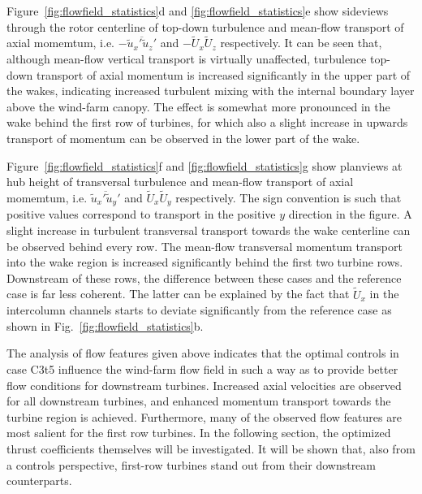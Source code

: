 \documentclass[wes, manuscript]{copernicus}
\begin{document}
Figure~\ref{fig:flowfield_statistics}d and \ref{fig:flowfield_statistics}e show sideviews through the rotor centerline of top-down turbulence and mean-flow transport of axial momemtum, i.e. $-\overline{\widetilde{u}_x' \widetilde{u}_z'}$ and $- \widetilde{U}_x \widetilde{U}_z$ respectively. It can be seen that, although mean-flow vertical transport is virtually unaffected, turbulence top-down transport of axial momentum is increased significantly in the upper part of the wakes, indicating increased turbulent mixing with the internal boundary layer above the wind-farm canopy. The effect is somewhat more pronounced in the wake behind the first row of turbines, for which also a slight increase in upwards transport of momentum can be observed in the lower part of the wake. 

Figure~\ref{fig:flowfield_statistics}f and \ref{fig:flowfield_statistics}g show planviews at hub height of transversal turbulence and mean-flow transport of axial momemtum, i.e. $\overline{\widetilde{u}_x' \widetilde{u}_y'}$ and $\widetilde{U}_x \widetilde{U}_y$ respectively. The sign convention is such that positive values correspond to transport in the positive $y$ direction in the figure. A slight increase in turbulent transversal transport towards the wake centerline can be observed behind every row. The mean-flow transversal momentum transport into the wake region is increased significantly behind the first two turbine rows. Downstream of these rows, the difference between these cases and the reference case is far less coherent. The latter can be explained by the fact that $\widetilde{U}_x$ in the intercolumn channels starts to deviate significantly from the reference case as shown in Fig.~\ref{fig:flowfield_statistics}b. 

The analysis of flow features given above indicates that the optimal controls in case C3t5 influence the wind-farm flow field in such a way as to provide better flow conditions for downstream turbines. Increased axial velocities are observed for all downstream turbines, and enhanced momentum transport towards the turbine region is achieved. Furthermore, many of the observed flow features are most salient for the first row turbines. In the following section, the optimized thrust coefficients themselves will be investigated. It will be shown that, also from a controls perspective, first-row turbines stand out from their downstream counterparts.
\end{document}
